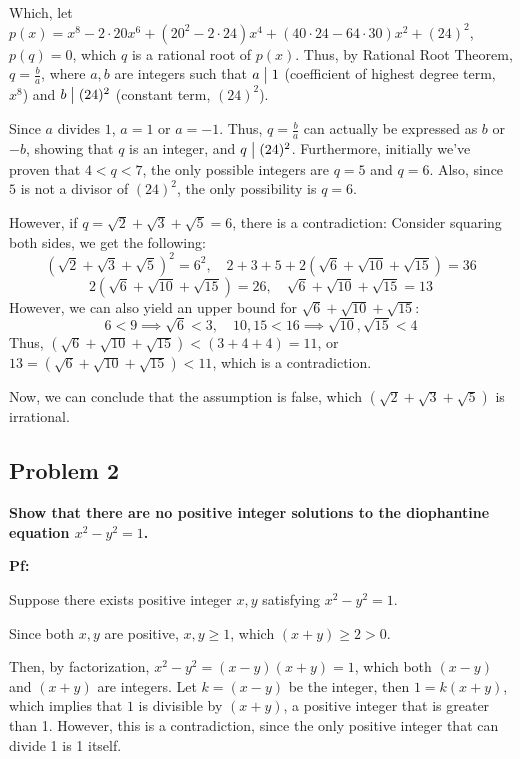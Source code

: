 \documentclass{article}
\begin{document}
Which, let $p(x)=x^8-2\cdot 20x^6+(20^2-2\cdot24)x^4 + (40\cdot24-64\cdot30)x^2 + (24)^2$, $p(q)=0$, which $q$ is a rational root of $p(x)$. Thus, by Rational Root Theorem, $q=\frac{b}{a}$, where $a, b$ are integers such that $a\bigm|1$ (coefficient of highest degree term, $x^8$) and $b\bigm|(24)^2$ (constant term, $(24)^2$). 

Since $a$ divides $1$, $a=1$ or $a=-1$. Thus, $q=\frac{b}{a}$ can actually be expressed as $b$ or $-b$, showing that $q$ is an integer, and $q\bigm| (24)^2$. Furthermore, initially we've proven that $4<q<7$, the only possible integers are $q=5$ and $q=6$. Also, since $5$ is not a divisor of $(24)^2$, the only possibility is $q=6$.

\hfill

However, if $q=\sqrt{2}+\sqrt{3}+\sqrt{5}=6$, there is a contradiction: Consider squaring both sides, we get the following:
$$(\sqrt{2}+\sqrt{3}+\sqrt{5})^2=6^2,\quad 2+3+5+2(\sqrt{6}+\sqrt{10}+\sqrt{15}) = 36$$
$$2(\sqrt{6}+\sqrt{10}+\sqrt{15})=26,\quad \sqrt{6}+\sqrt{10}+\sqrt{15} = 13$$
However, we can also yield an upper bound for $\sqrt{6}+\sqrt{10}+\sqrt{15}$:
$$6<9\implies \sqrt{6}<3,\quad 10,15 < 16 \implies \sqrt{10},\sqrt{15} < 4$$
Thus, $(\sqrt{6}+\sqrt{10}+\sqrt{15}) < (3+4+4) = 11$, or $13 = (\sqrt{6}+\sqrt{10}+\sqrt{15}) < 11$, which is a contradiction.

\hfill

Now, we can conclude that the assumption is false, which $(\sqrt{2}+\sqrt{3}+\sqrt{5})$ is irrational.

\hfill

\subsection{Problem 2}
\textbf{Show that there are no positive integer solutions to the diophantine equation $x^2-y^2=1$.}

\textbf{Pf:}

Suppose there exists positive integer $x,y$ satisfying $x^2-y^2=1$.

Since both $x,y$ are positive, $x,y\geq 1$, which $(x+y) \geq 2>0$. 

Then, by factorization, $x^2-y^2=(x-y)(x+y)=1$, which both $(x-y)$ and $(x+y)$ are integers. Let $k=(x-y)$ be the integer, then $1=k(x+y)$, which implies that $1$ is divisible by $(x+y)$, a positive integer that is greater than 1. However, this is a contradiction, since the only positive integer that can divide 1 is 1 itself.
\end{document}
